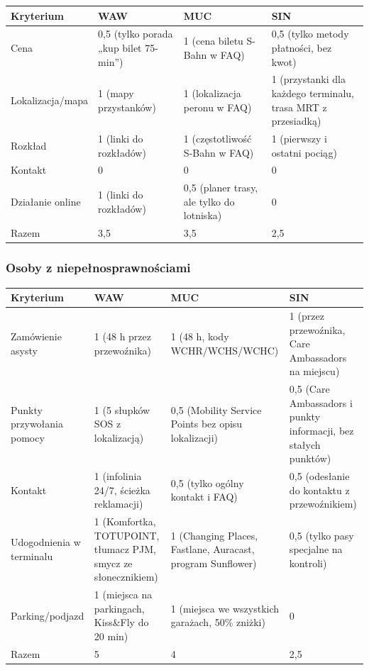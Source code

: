 \documentclass[11pt,a4paper]{article}
\begin{document}
{\small
\begin{tabularx}{\textwidth}{@{}L{2.8cm}YYY@{}}
\toprule
Kryterium & WAW & MUC & SIN \\
\midrule
Cena & 0,5 (tylko porada „kup bilet 75-min”) & 1 (cena biletu S-Bahn w FAQ) & 0,5 (tylko metody płatności, bez kwot) \\
Lokalizacja/mapa & 1 (mapy przystanków) & 1 (lokalizacja peronu w FAQ) & 1 (przystanki dla każdego terminalu, trasa MRT z przesiadką) \\
Rozkład & 1 (linki do rozkładów) & 1 (częstotliwość S-Bahn w FAQ) & 1 (pierwszy i ostatni pociąg) \\
Kontakt & 0 & 0 & 0 \\
Działanie online & 1 (linki do rozkładów) & 0,5 (planer trasy, ale tylko do lotniska) & 0 \\
\midrule
Razem & 3,5 & 3,5 & 2,5 \\
\bottomrule
\end{tabularx}
}

\subsubsection*{Osoby z niepełnosprawnościami}

{\small
\begin{tabularx}{\textwidth}{@{}L{2.8cm}YYY@{}}
\toprule
Kryterium & WAW & MUC & SIN \\
\midrule
Zamówienie asysty & 1 (48 h przez przewoźnika) & 1 (48 h, kody WCHR/WCHS/WCHC) & 1 (przez przewoźnika, Care Ambassadors na miejscu) \\
Punkty przywołania pomocy & 1 (5 słupków SOS z lokalizacją) & 0,5 (Mobility Service Points bez opisu lokalizacji) & 0,5 (Care Ambassadors i punkty informacji, bez stałych punktów) \\
Kontakt & 1 (infolinia 24/7, ścieżka reklamacji) & 0,5 (tylko ogólny kontakt i FAQ) & 0,5 (odesłanie do kontaktu z przewoźnikiem) \\
Udogodnienia w terminalu & 1 (Komfortka, TOTUPOINT, tłumacz PJM, smycz ze słonecznikiem) & 1 (Changing Places, Fastlane, Auracast, program Sunflower) & 0,5 (tylko pasy specjalne na kontroli) \\
Parking/podjazd & 1 (miejsca na parkingach, Kiss\&Fly do 20 min) & 1 (miejsca we wszystkich garażach, 50\% zniżki) & 0 \\
\midrule
Razem & 5 & 4 & 2,5 \\
\bottomrule
\end{tabularx}
}
\end{document}
